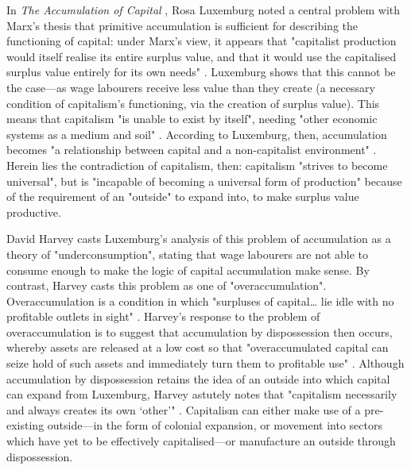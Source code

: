In \emph{The Accumulation of Capital} \citeyearpar{luxemburg_accumulation_2015}, Rosa Luxemburg noted a central problem with Marx's thesis that primitive accumulation is sufficient for describing the functioning of capital: under Marx's view, it appears that "capitalist production would itself realise its entire surplus value, and that it would use the capitalised surplus value entirely for its own needs" \citep[p. 309]{luxemburg_accumulation_2015}. Luxemburg shows that this cannot be the case—as wage labourers receive less value than they create (a necessary condition of capitalism's functioning, via the creation of surplus value). This means that capitalism "is unable to exist by itself", needing "other economic systems as a medium and soil" \citeyearpar[p. 447]{luxemburg_accumulation_2015}. According to Luxemburg, then, accumulation becomes "a relationship between capital and a non-capitalist environment" \citeyearpar[p. 398]{luxemburg_accumulation_2015}. Herein lies the contradiction of capitalism, then: capitalism "strives to become universal", but is "incapable of becoming a universal form of production" \citeyearpar[p. 447]{luxemburg_accumulation_2015} because of the requirement of an "outside" to expand into, to make surplus value productive.

David Harvey casts Luxemburg's analysis of this problem of accumulation as a theory of "underconsumption", stating that wage labourers are not able to consume enough to make the logic of capital accumulation make sense. By contrast, Harvey casts this problem as one of "overaccumulation". Overaccumulation is a condition in which "surpluses of capital\ldots{} lie idle with no profitable outlets in sight" \citeyearpar[p. 149]{harvey_new_2003}. Harvey's response to the problem of overaccumulation is to suggest that accumulation by dispossession then occurs, whereby assets are released at a low cost so that "overaccumulated capital can seize hold of such assets and immediately turn them to profitable use" \citeyearpar[p. 149]{harvey_new_2003}. Although accumulation by dispossession retains the idea of an outside into which capital can expand from Luxemburg, Harvey astutely notes that "capitalism necessarily and always creates its own `other'" \citeyearpar[p. 141]{harvey_new_2003}. Capitalism can either make use of a pre-existing outside—in the form of colonial expansion, or movement into sectors which have yet to be effectively capitalised—or manufacture an outside through dispossession.

